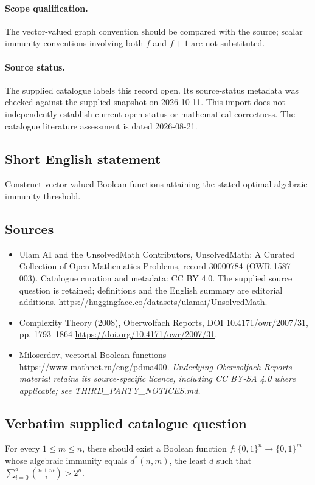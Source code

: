 \documentclass[11pt]{article}
\begin{document}
\paragraph{Scope qualification.}
The vector-valued graph convention should be compared with the source; scalar immunity conventions involving both $f$ and $f+1$ are not substituted.
\paragraph{Source status.}
The supplied catalogue labels this record open. Its source-status metadata was checked against the supplied snapshot on 2026-10-11. This import does not independently establish current open status or mathematical correctness. The catalogue literature assessment is dated 2026-08-21.
\subsection{Short English statement}
Construct vector-valued Boolean functions attaining the stated optimal algebraic-immunity threshold.
\subsection{Sources}
\begin{itemize}
\item[S1] Ulam AI and the UnsolvedMath Contributors, UnsolvedMath: A Curated Collection of Open Mathematics Problems, record 30000784 (OWR-1587-003). Catalogue curation and metadata: CC BY 4.0. The supplied source question is retained; definitions and the English summary are editorial additions.
\url{https://huggingface.co/datasets/ulamai/UnsolvedMath}.
\item[S2] Complexity Theory (2008), Oberwolfach Reports, DOI 10.4171/owr/2007/31, pp. 1793--1864
\url{https://doi.org/10.4171/owr/2007/31}.
\item[S3] Miloserdov, vectorial Boolean functions
\url{https://www.mathnet.ru/eng/pdma400}.
\textit{Underlying Oberwolfach Reports material retains its source-specific licence, including CC BY-SA 4.0 where applicable; see THIRD\_PARTY\_NOTICES.md.}
\end{itemize}
\subsection{Verbatim supplied catalogue question}
For every $1\leq m\leq n$, there should exist a Boolean function $f:\{0,1\}^n\to\{0,1\}^m$ whose algebraic immunity equals $d^*(n,m)$, the least $d$ such that $\sum_{i=0}^d\binom{n+m}{i}>2^n$.
\end{document}
